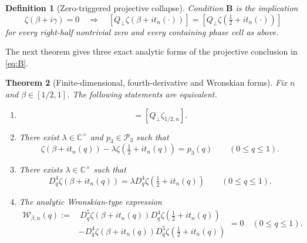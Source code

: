 \documentclass[11pt]{amsart}
\numberwithin{equation}{section}
\newtheorem{theorem}{Theorem}[section]
\newtheorem{definition}[theorem]{Definition}
\newcommand{\C}{\mathbb C}
\newcommand{\Pcal}{\mathcal P}
\newcommand{\Dq}{D_q}
\begin{document}
\begin{definition}[Zero-triggered projective collapse]
\label{def:B-condition}
Condition $\mathbf B$ is the implication
\begin{equation}
 \boxed{
 \zeta(\beta+i\gamma)=0
 \quad\Longrightarrow\quad
 [Q_\perp\zeta(\beta+i t_n(\cdot))]
 =
 [Q_\perp\zeta(\tfrac12+i t_n(\cdot))]
 }
 \tag{B}\label{eq:B}
\end{equation}
for every right-half nontrivial zero and every containing phase cell as above.
\end{definition}

The next theorem gives three exact analytic forms of the projective conclusion
in \eqref{eq:B}.

\begin{theorem}[Finite-dimensional, fourth-derivative and Wronskian forms]
\label{thm:B-equivalent-forms}
Fix $n$ and $\beta\in[1/2,1]$.  The following statements are equivalent.

\begin{enumerate}
\item[(i)]
\begin{equation}
 [Q_\perp\zeta_{\beta,n}]
 =[Q_\perp\zeta_{1/2,n}].
 \label{eq:B-form-projective}
\end{equation}

\item[(ii)] There exist $\lambda\in\C^\times$ and $p_3\in\Pcal_3$ such that
\begin{equation}
 \boxed{
 \zeta(\beta+i t_n(q))
 -\lambda\zeta(\tfrac12+i t_n(q))
 =p_3(q)
 \qquad(0\leq q\leq1).
 }
 \tag{B'}\label{eq:B-prime}
\end{equation}

\item[(iii)] There exists $\lambda\in\C^\times$ such that
\begin{equation}
 \boxed{
 \Dq^4\zeta(\beta+i t_n(q))
 =\lambda\Dq^4\zeta(\tfrac12+i t_n(q))
 \qquad(0\leq q\leq1).
 }
 \tag{B''}\label{eq:B-double-prime}
\end{equation}

\item[(iv)] The analytic Wronskian-type expression
\begin{equation}
 \boxed{
 \begin{aligned}
 \mathcal W_{\beta,n}(q)
 :=&\,
 \Dq^5\zeta(\beta+i t_n(q))
 \Dq^4\zeta(\tfrac12+i t_n(q))\\
 &-
 \Dq^4\zeta(\beta+i t_n(q))
 \Dq^5\zeta(\tfrac12+i t_n(q))
 \end{aligned}
 =0
 \quad(0\leq q\leq1).
 }
 \tag{B'''}\label{eq:B-triple-prime}
\end{equation}
\end{enumerate}
\end{theorem}
\end{document}
